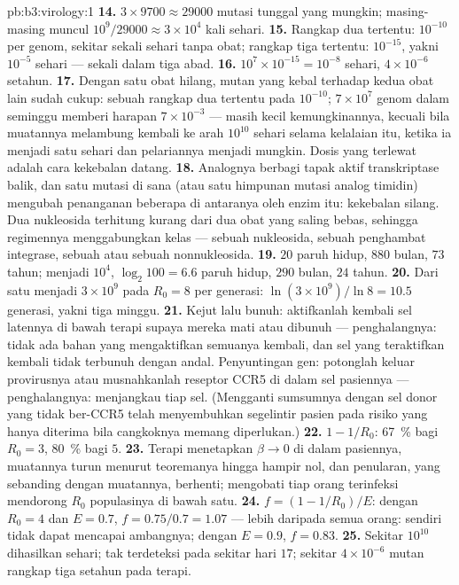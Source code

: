 \begin{solution}{pb:b3:virology:1}
\textbf{14.} $3\times 9700 \approx \num{29000}$ mutasi tunggal yang mungkin;
masing-masing muncul $10^{9}/\num{29000} \approx 3\times 10^{4}$ kali sehari.
\textbf{15.} Rangkap dua tertentu: $10^{-10}$ per genom, sekitar sekali sehari
tanpa obat; rangkap tiga tertentu: $10^{-15}$, yakni $10^{-5}$ sehari ---
sekali dalam tiga abad.
\textbf{16.} $10^{7}\times 10^{-15} = 10^{-8}$ sehari, $4\times 10^{-6}$
setahun.
\textbf{17.} Dengan satu obat hilang, mutan yang kebal terhadap kedua obat
lain sudah cukup: sebuah rangkap dua tertentu pada $10^{-10}$;
$7\times 10^{7}$ genom dalam seminggu memberi harapan $7\times 10^{-3}$ ---
masih kecil kemungkinannya, kecuali bila muatannya melambung kembali ke arah
$10^{10}$ sehari selama kelalaian itu, ketika ia menjadi satu sehari dan
pelariannya menjadi mungkin. Dosis yang terlewat adalah cara kekebalan datang.
\textbf{18.} Analognya berbagi tapak aktif transkriptase balik,
dan satu mutasi di sana (atau satu himpunan mutasi analog timidin) mengubah
penanganan beberapa di antaranya oleh enzim itu: kekebalan silang. Dua
nukleosida terhitung kurang dari dua obat yang saling bebas, sehingga
regimennya menggabungkan kelas --- sebuah nukleosida, sebuah penghambat
integrase, sebuah  atau sebuah nonnukleosida.
\textbf{19.} $20$ paruh hidup, $880$ bulan, $73$ tahun; menjadi $10^{4}$,
$\log_{2}100 = 6.6$ paruh hidup, $290$ bulan, $24$ tahun.
\textbf{20.} Dari satu  menjadi $3\times 10^{9}$ pada $R_{0} = 8$ per
generasi: $\ln(3\times 10^{9})/\ln 8 = 10.5$ generasi, yakni tiga minggu.
\textbf{21.} Kejut lalu bunuh: aktifkanlah kembali sel latennya di bawah
terapi supaya mereka mati atau dibunuh --- penghalangnya: tidak ada bahan yang
mengaktifkan semuanya kembali, dan sel yang teraktifkan kembali tidak terbunuh
dengan andal. Penyuntingan gen: potonglah keluar provirusnya atau musnahkanlah
reseptor CCR5 di dalam sel pasiennya --- penghalangnya: menjangkau tiap sel.
(Mengganti sumsumnya dengan sel donor yang tidak ber-CCR5 telah menyembuhkan
segelintir pasien pada risiko yang hanya diterima bila cangkoknya memang
diperlukan.)
\textbf{22.} $1 - 1/R_{0}$: \qty{67}{\%} bagi $R_{0} = 3$, \qty{80}{\%} bagi
$5$.
\textbf{23.} Terapi menetapkan $\beta \to 0$ di dalam pasiennya, muatannya
turun menurut teoremanya hingga hampir nol, dan penularan, yang
sebanding dengan muatannya, berhenti; mengobati tiap orang terinfeksi mendorong
$R_{0}$ populasinya di bawah satu.
\textbf{24.} $f = (1 - 1/R_{0})/E$: dengan $R_{0} = 4$ dan $E = 0.7$, $f =
0.75/0.7 = 1.07$ --- lebih daripada semua orang:  sendiri tidak dapat
mencapai ambangnya; dengan $E = 0.9$, $f = 0.83$.
\textbf{25.} Sekitar $10^{10}$  dihasilkan sehari; tak terdeteksi pada
sekitar hari $17$; sekitar $4\times 10^{-6}$ mutan rangkap tiga setahun pada
terapi.
\end{solution}
